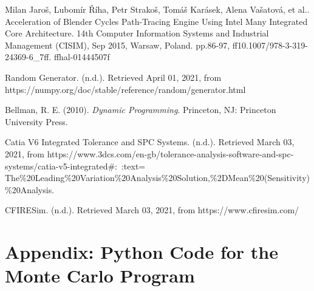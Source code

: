\documentclass[11pt]{article}
\begin{document}
\begin{thebibliography}{9}

Milan Jaroš, Lubomír Říha, Petr Strakoš, Tomáš Karásek, Alena Vašatová, et al.. Acceleration of Blender Cycles Path-Tracing Engine Using Intel Many Integrated Core Architecture. 14th Computer Information Systems and Industrial Management (CISIM), Sep 2015, Warsaw, Poland. pp.86-97, ff10.1007/978-3-319-24369-6\_7ff. ffhal-01444507f

Random Generator. (n.d.). Retrieved April 01, 2021, from https://numpy.org/doc/stable/reference/random/generator.html


Bellman, R. E. (2010). \emph{Dynamic Programming}. Princeton, NJ: Princeton University Press.

Catia V6 Integrated Tolerance and SPC Systems. (n.d.). Retrieved March 03, 2021, from https://www.3dcs.com/en-gb/tolerance-analysis-software-and-spc-systems/catia-v5-integrated\#:~:text=\\The\%20Leading\%20Variation\%20Analysis\%20Solution,\%2DMean\%20(Sensitivity)\%20Analysis.

CFIRESim. (n.d.). Retrieved March 03, 2021, from https://www.cfiresim.com/


\end{thebibliography}

\newpage

\appendix


\section{Appendix: Python Code for the Monte Carlo Program}
\end{document}
